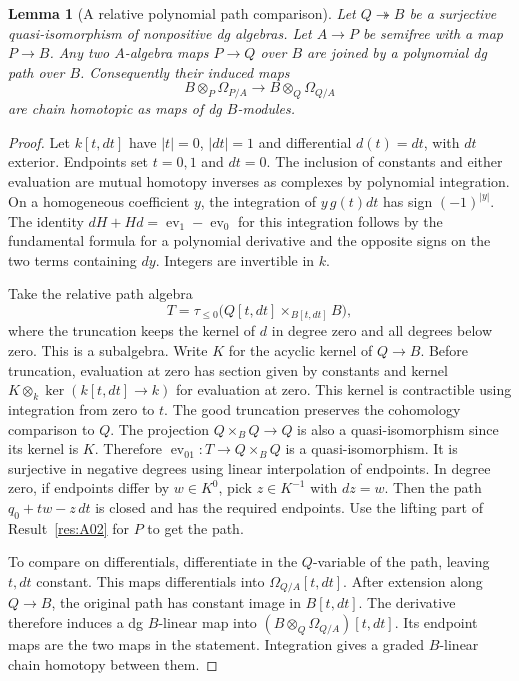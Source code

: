 \documentclass[11pt,oneside,openany]{book}
\newtheorem{lemma}[theorem]{Lemma}
\theoremstyle{definition}
\theoremstyle{remark}
\begin{document}
\begin{lemma}[A relative polynomial path comparison]\label{res:A07}
Let \(Q\twoheadrightarrow B\) be a surjective quasi-isomorphism of
nonpositive dg algebras. Let \(A\to P\) be semifree with a map
\(P\to B\).
Any two \(A\)-algebra maps \(P\to Q\) over \(B\) are joined by a
polynomial dg path over \(B\). Consequently their induced maps
\[
 B\otimes_P\Omega_{P/A}\longrightarrow B\otimes_Q\Omega_{Q/A}
\]
are chain homotopic as maps of dg \(B\)-modules.
\end{lemma}
\begin{proof}
Let \(k[t,dt]\) have \(|t|=0\), \(|dt|=1\) and differential
\(d(t)=dt\), with \(dt\) exterior. Endpoints set \(t=0,1\) and
\(dt=0\). The inclusion of constants and either evaluation are
mutual homotopy inverses as complexes by polynomial integration.
On a homogeneous coefficient \(y\), the integration of
\(y\,g(t)dt\) has sign \((-1)^{|y|}\).
The identity \(dH+Hd=\operatorname{ev}_1-\operatorname{ev}_0\)
for this integration follows by the fundamental formula for a
polynomial derivative and the opposite signs on the two terms
containing \(d y\). Integers are invertible in \(k\).

Take the relative path algebra
\[
 T=\tau_{\leq0}\bigl(Q[t,dt]\times_{B[t,dt]} B\bigr),
\]
where the truncation keeps the kernel of \(d\) in degree zero and
all degrees below zero. This is a subalgebra. Write \(K\) for the
acyclic kernel of \(Q\to B\). Before truncation, evaluation at zero
has section given by constants and kernel
\(K\otimes_k\ker(k[t,dt]\to k)\) for evaluation at zero.
This kernel is contractible using integration from zero to \(t\).
The good truncation preserves the cohomology comparison to \(Q\).
The projection \(Q\times_B Q\to Q\) is also a quasi-isomorphism
since its kernel is \(K\). Therefore
\(\operatorname{ev}_{01}:T\to Q\times_B Q\) is a quasi-isomorphism.
It is surjective in negative degrees using linear interpolation
of endpoints. In degree zero, if endpoints differ by \(w\in K^0\),
pick \(z\in K^{-1}\) with \(dz=w\). Then the path
\(q_0+tw-z\,dt\) is closed and has the required endpoints.
Use the lifting part of Result~\ref{res:A02} for \(P\) to get the
path.

To compare on differentials, differentiate in the \(Q\)-variable
of the path, leaving \(t,dt\) constant. This maps differentials
into \(\Omega_{Q/A}[t,dt]\). After extension along \(Q\to B\), the
original path has constant image in \(B[t,dt]\). The derivative
therefore induces a dg \(B\)-linear map into
\((B\otimes_Q\Omega_{Q/A})[t,dt]\). Its endpoint maps are the two
maps in the statement. Integration gives a graded \(B\)-linear
chain homotopy between them.
\end{proof}
\end{document}
